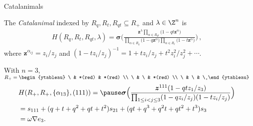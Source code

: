 \documentclass[dvipsnames]{beamer}
\newcommand{\mynone}{\ }
\newcommand{\zz}{{\boldsymbol z}}
\newcommand{\sigmabold}{\boldsymbol \sigma}
\theoremstyle{definition}
\newcounter{c}
\begin{document}
\begin{frame}{Catalanimals}
  \begin{definition}
    The \emph{Catalanimal} indexed by $R_q, R_t, R_{qt} \subseteq R_+$
    and $\lambda \in \Z^n$ is \pause\vspace{-.4mm}
    \begin{align*}
      H(R_q,R_t,R_{qt},\lambda)
      = \sigmabold
      \bigg(\frac{\zz ^\lambda \prod_{\alpha \in
      R_{qt}} \big(1-q  t \zz ^\alpha \big)} {\prod_{\alpha \in R_q} \big(1-q \zz ^\alpha\big)
      \prod_{\alpha \in R_t} \big(1-t \zz ^\alpha\big)} 
      \bigg)\,,
    \end{align*}
   where \(\zz^{\alpha_{ij}} = z_i/z_j\) and \((1-t z_i/z_j)^{-1} =
   1+tz_i/z_j+t^2 z_i^2/z_j^2+\cdots\).
  \end{definition}
  \pause
With  $n=3$, \(R_+ =
\begin{ytableau}
  \mynone & *(red) & *(red) \\
  \mynone & \mynone & *(red) \\
  \mynone & \mynone & \mynone
\end{ytableau}
\)
\vspace{-3mm}
\begin{eqnarray*}
& \displaystyle H(R_+,R_+,\{\alpha_{13}\}, (111)) = \pause 
\sigmabold \Big( \frac{\zz^{111} (1 - q t z_{1} /z_3)}
{\prod_{1\le i < j \le 3}(1 - q z_{i}/ z_{j})(1 - t z_{i}/ z_{j})} \Big)  \\
&  = s_{111} + (q+t+q^2+qt+t^2)s_{21}+ (qt + q^3+ q^2t + qt^2+t^3)s_{3} \\
& = \omega \nabla e_3.
\end{eqnarray*}
\vspace{4mm}
\end{frame}
\end{document}
